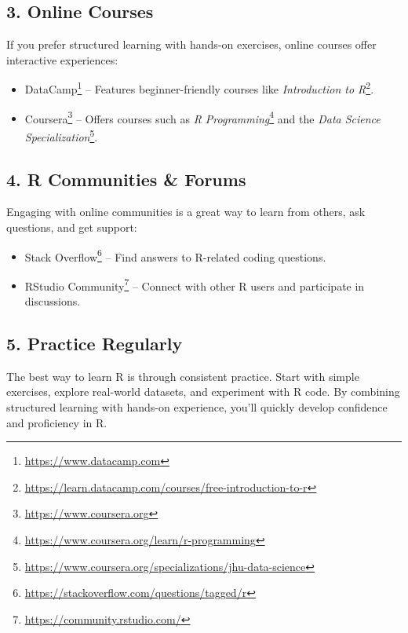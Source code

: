 \documentclass[
  11pt,
]{book}
\providecommand{\tightlist}{%
  \setlength{\itemsep}{0pt}\setlength{\parskip}{0pt}}
\renewcommand{\href}[2]{#2\footnote{\url{#1}}}
\theoremstyle{definition}
\theoremstyle{definition}
\theoremstyle{definition}
\theoremstyle{definition}
\theoremstyle{remark}
\begin{document}
\subsection*{3. Online Courses}\label{online-courses}


If you prefer structured learning with hands-on exercises, online courses offer interactive experiences:

\begin{itemize}
\tightlist
\item
  \href{https://www.datacamp.com}{DataCamp} -- Features beginner-friendly courses like \href{https://learn.datacamp.com/courses/free-introduction-to-r}{\emph{Introduction to R}}.\\
\item
  \href{https://www.coursera.org}{Coursera} -- Offers courses such as \href{https://www.coursera.org/learn/r-programming}{\emph{R Programming}} and the \href{https://www.coursera.org/specializations/jhu-data-science}{\emph{Data Science Specialization}}.
\end{itemize}

\subsection*{4. R Communities \& Forums}\label{r-communities-forums}


Engaging with online communities is a great way to learn from others, ask questions, and get support:

\begin{itemize}
\tightlist
\item
  \href{https://stackoverflow.com/questions/tagged/r}{Stack Overflow} -- Find answers to R-related coding questions.\\
\item
  \href{https://community.rstudio.com/}{RStudio Community} -- Connect with other R users and participate in discussions.
\end{itemize}

\subsection*{5. Practice Regularly}\label{practice-regularly}


The best way to learn R is through consistent practice. Start with simple exercises, explore real-world datasets, and experiment with R code. By combining structured learning with hands-on experience, you'll quickly develop confidence and proficiency in R.
\end{document}
